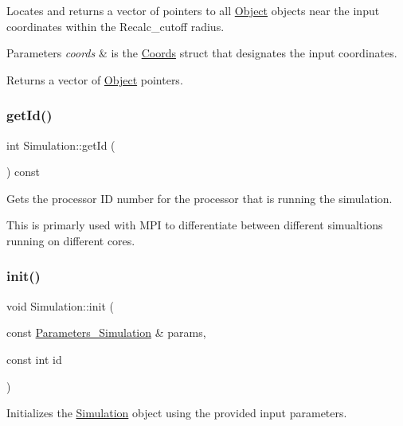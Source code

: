 Locates and returns a vector of pointers to all \hyperlink{class_object}{Object} objects near the input coordinates within the Recalc\+\_\+cutoff radius. 


\begin{DoxyParams}{Parameters}
{\em coords} & is the \hyperlink{struct_coords}{Coords} struct that designates the input coordinates. \\
\hline
\end{DoxyParams}
\begin{DoxyReturn}{Returns}
a vector of \hyperlink{class_object}{Object} pointers. 
\end{DoxyReturn}
\mbox{\label{class_simulation_aff40f268758bd9a0f390a649fc45c05e}} 
\subsubsection{\texorpdfstring{get\+Id()}{getId()}}
{\footnotesize\ttfamily int Simulation\+::get\+Id (\begin{DoxyParamCaption}{ }\end{DoxyParamCaption}) const}

Gets the processor ID number for the processor that is running the simulation.

This is primarly used with M\+PI to differentiate between different simualtions running on different cores. \mbox{\label{class_simulation_af88e5e0634b373ba28f1dd87670725a6}} 
\subsubsection{\texorpdfstring{init()}{init()}}
{\footnotesize\ttfamily void Simulation\+::init (\begin{DoxyParamCaption}\item[{const \hyperlink{struct_parameters___simulation}{Parameters\+\_\+\+Simulation} \&}]{params,  }\item[{const int}]{id }\end{DoxyParamCaption})}



Initializes the \hyperlink{class_simulation}{Simulation} object using the provided input parameters. 


